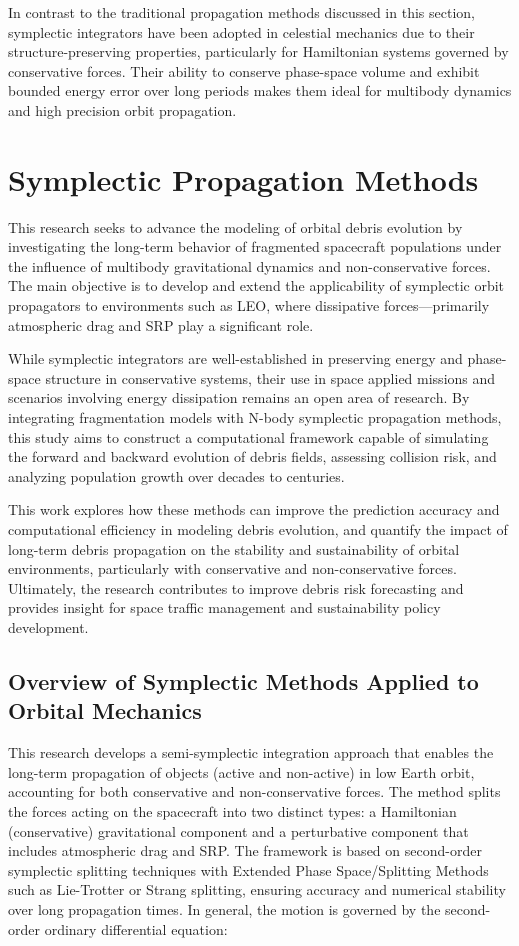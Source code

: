 \documentclass[letterpaper, paper,11pt]{AAS}
\begin{document}
In contrast to the traditional propagation methods discussed in this section, symplectic integrators have been adopted in celestial mechanics due to their structure-preserving properties, particularly for Hamiltonian systems governed by conservative forces. Their ability to conserve phase-space volume and exhibit bounded energy error over long periods makes them ideal for multibody dynamics and high precision orbit propagation\cite{hubaux_symplectic_2012}.


\section{Symplectic Propagation Methods}
This research seeks to advance the modeling of orbital debris evolution by investigating the long-term behavior of fragmented spacecraft populations under the influence of multibody gravitational dynamics and non-conservative forces. The main objective is to develop and extend the applicability of symplectic orbit propagators to environments such as LEO, where dissipative forces—primarily atmospheric drag and SRP play a significant role.

While symplectic integrators are well-established in preserving energy and phase-space structure in conservative systems, their use in space applied missions and scenarios involving energy dissipation remains an open area of research. By integrating fragmentation models with N-body symplectic propagation methods, this study aims to construct a computational framework capable of simulating the forward and backward evolution of debris fields, assessing collision risk, and analyzing population growth over decades to centuries.

This work explores how these methods can improve the prediction accuracy and computational efficiency in modeling debris evolution, and quantify the impact of long-term debris propagation on the stability and sustainability of orbital environments, particularly with conservative and non-conservative forces. Ultimately, the research contributes to improve debris risk forecasting and provides insight for space traffic management and sustainability policy development.

\subsection{Overview of Symplectic Methods Applied to Orbital Mechanics}

This research develops a semi-symplectic integration approach that enables the long-term propagation of objects (active and non-active) in low Earth orbit, accounting for both conservative and non-conservative forces. The method splits the forces acting on the spacecraft into two distinct types: a Hamiltonian (conservative) gravitational component and a perturbative component that includes atmospheric drag and SRP. The framework is based on second-order symplectic splitting techniques with Extended Phase Space/Splitting Methods such as Lie-Trotter or Strang splitting, ensuring accuracy and numerical stability over long propagation times\cite{luo_applying_2017}. In general, the motion is governed by the second-order ordinary differential equation:
\end{document}
